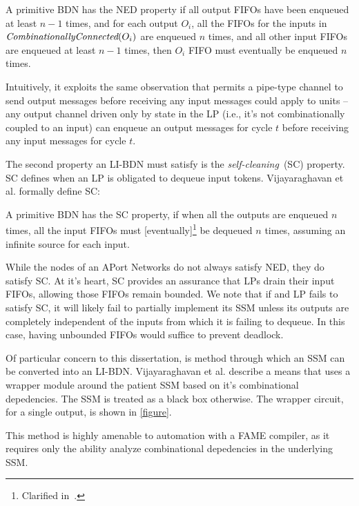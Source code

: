 \begin{widequote}
A primitive BDN has the NED property if all output FIFOs have been enqueued at least $n-1$ times,
and for each output $O_i$, all the FIFOs for the inputs in $\emph{CombinationallyConnected}(O_i)$
are enqueued $n$ times, and all other input FIFOs are enqueued at least $n-1$ times, then $O_i$ FIFO
must eventually be enqueued $n$ times.
\end{widequote}\label{def:ned}

Intuitively, it exploits the same observation that
permits a pipe-type channel to send output messages before receiving any input
messages could apply to units -- any output channel driven only by state in the
LP (i.e., it's not combinationally coupled to an input) can enqueue an output
messages for cycle $t$ before receiving any input messages for cycle $t$.

The second property an LI-BDN must satisfy is the \emph{self-cleaning}~(SC) property. SC 
defines when an LP is obligated to dequeue input tokens. Vijayaraghavan et al.\cite{LIBDN} formally define SC:

\begin{widequote}
A primitive BDN has the SC property, if when all the
outputs are enqueued $n$ times, all the input FIFOs must
[eventually]\footnote{Clarified in~\cite{LIBDNMasters}.} be dequeued $n$ times, assuming an infinite source for each
input.
\end{widequote}\label{def:sc}

While the nodes of an APort Networks do not always satisfy NED, they do satisfy
SC. At it's heart, SC provides an assurance that LPs drain their input FIFOs,
allowing those FIFOs remain bounded. We note that if and LP fails to satisfy
SC, it will likely fail to partially implement its SSM unless its outputs are
completely independent of the inputs from which it is failing to dequeue. In
this case, having unbounded FIFOs would suffice to prevent deadlock.

Of particular concern to this dissertation, is method through which an SSM can
be converted into an LI-BDN.  Vijayaraghavan et al. describe a means that uses
a wrapper module around the patient SSM based on it's combinational
depedencies. The SSM is treated as a black box otherwise. The wrapper circuit,
for a single output, is shown in \ref{figure}.

This method is highly amenable to automation with a FAME compiler, as it requires
only the ability analyze combinational depedencies in the underlying SSM.

